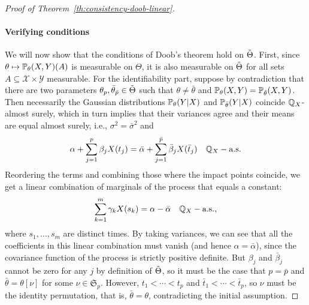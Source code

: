 \begin{proof}[Proof of Theorem~\ref{th:consistency-doob-linear}]
\paragraph{Verifying conditions} We will now show that the conditions of Doob's theorem hold on \(\tilde{\Theta}\). First, since \(\theta \mapsto \mathbb{P}_\theta(X, Y)(A)\) is measurable on \(\Theta\), it is also measurable on \(\tilde{\Theta}\) for all sets \(A\subseteq \mathcal X \times \mathcal Y\) measurable. For the identifiability part, suppose by contradiction that there are two parameters \(\theta_p,\bar\theta_{\bar p} \in \tilde{\Theta}\) such that \(\theta\neq \bar\theta\) and \(\mathbb{P}_{\theta}(X, Y) = \mathbb{P}_{\bar\theta}(X, Y)\). Then necessarily the Gaussian distributions \(\mathbb{P}_{\theta}(Y|X)\) and \(\mathbb{P}_{\bar\theta}(Y|X)\) coincide \(\mathbb{Q}_X\)-almost surely, which in turn implies that their variances agree and their means are equal almost surely, i.e., \(\sigma^2=\bar\sigma^2\) and
\[
  \alpha + \sum_{j=1}^{p} \beta_j X(t_j) = \bar\alpha + \sum_{j=1}^{\bar p} \bar\beta_j X(\bar t_j)\quad \mathbb{Q}_X-\text{a.s.}
\]
Reordering the terms and combining those where the impact points coincide, we get a linear combination of marginals of the process that equals a constant:
\[
\sum_{k=1}^m \gamma_k X(s_k) = \alpha - \bar\alpha\quad \mathbb{Q}_X-\text{a.s.},
\]
where \(s_1,\dots,s_m\) are distinct times. By taking variances, we can see that all the coefficients in this linear combination must vanish (and hence \(\alpha=\bar\alpha\)), since the covariance function of the process is strictly positive definite. But \(\beta_j\) and \(\bar\beta_j\) cannot be zero for any \(j\) by definition of \(\tilde{\Theta}\), so it must be the case that \(p=\bar p\) and \(\bar\theta=\theta[\nu]\) for some \(\nu \in \mathfrak{S}_p\). However, \(t_1< \cdots < t_p\) and \(\bar t_1 < \cdots < \bar t_p\), so  \(\nu\) must be the identity permutation, that is, \(\bar\theta=\theta\), contradicting the initial assumption.


\end{proof}
